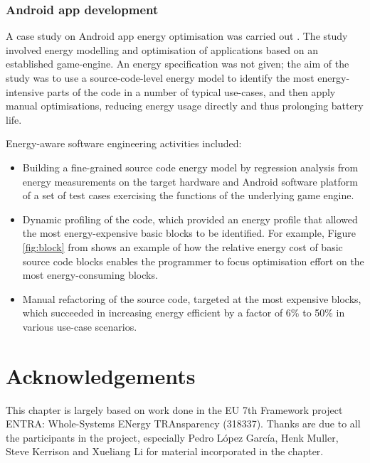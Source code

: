 \documentclass[oneside]{book}
\begin{document}
\subsubsection{Android app development}\label{android-scenario}

A case study on Android app energy optimisation was carried out \cite{LiGallagher-TSE-2016}.  
The study involved  energy modelling and optimisation of applications based on an established game-engine.  
An energy specification was not given; the aim of the study was to use a source-code-level energy model to 
identify the most energy-intensive parts of the code in a number of typical use-cases, 
and then apply manual optimisations, reducing energy usage directly and thus prolonging battery life.

Energy-aware software engineering activities included:
\begin{itemize}
\item
Building a fine-grained source code energy model by regression
analysis from energy measurements on the target hardware and Android
software platform of a set of test cases exercising the functions of
the underlying game engine.

\item

Dynamic profiling of the code, which provided an energy profile that
allowed the most energy-expensive basic blocks to be identified. For example, Figure \ref{fig:block} 
from \cite{LiGallagher-TSE-2016} shows an example of how the relative energy cost of
basic source code blocks enables the programmer to focus optimisation effort on the most energy-consuming
blocks.


\item Manual refactoring of the source code, targeted at the most
  expensive blocks, which succeeded in increasing energy efficient by
  a factor of 6\% to 50\% in various use-case scenarios.
\end{itemize}


\section*{Acknowledgements}

This chapter is largely based on work done in the EU 7th Framework project ENTRA: Whole-Systems ENergy TRAnsparency (318337).
Thanks are due to all the participants in the project, especially Pedro L\'{o}pez Garc\'{i}a, Henk Muller, Steve Kerrison and Xueliang Li 
for material incorporated in the chapter.



\end{document}
